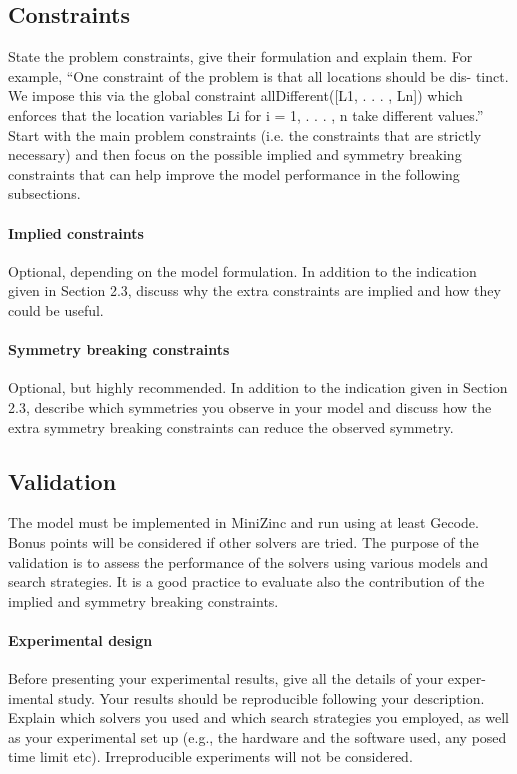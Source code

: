 \documentclass{article}
\begin{document}
\subsection{Constraints}

State the problem constraints, give their formulation and explain them. For example, “One constraint of the problem is that all locations should be dis- tinct. We impose this via the global constraint allDifferent([L1, . . . , Ln]) which enforces that the location variables Li for i = 1, . . . , n take different values.”
Start with the main problem constraints (i.e. the constraints that are strictly necessary) and then focus on the possible implied and symmetry breaking constraints that can help improve the model performance in the following subsections.


\paragraph{Implied constraints}
Optional, depending on the model formulation. In addition to the indication given in Section 2.3, discuss why the extra constraints are implied and how they could be useful.

\paragraph{Symmetry breaking constraints}
Optional, but highly recommended. In addition to the indication given in Section 2.3, describe which symmetries you observe in your model and discuss how the extra symmetry breaking constraints can reduce the observed symmetry.


\subsection{Validation}
The model must be implemented in MiniZinc and run using at least Gecode. Bonus points will be considered if other solvers are tried. The purpose of the validation is to assess the performance of the solvers using various models and search strategies. It is a good practice to evaluate also the contribution of the implied and symmetry breaking constraints.

\paragraph{Experimental design}
Before presenting your experimental results, give all the details of your exper- imental study. Your results should be reproducible following your description. Explain which solvers you used and which search strategies you employed, as well as your experimental set up (e.g., the hardware and the software used, any posed time limit etc). Irreproducible experiments will not be considered.
\end{document}
